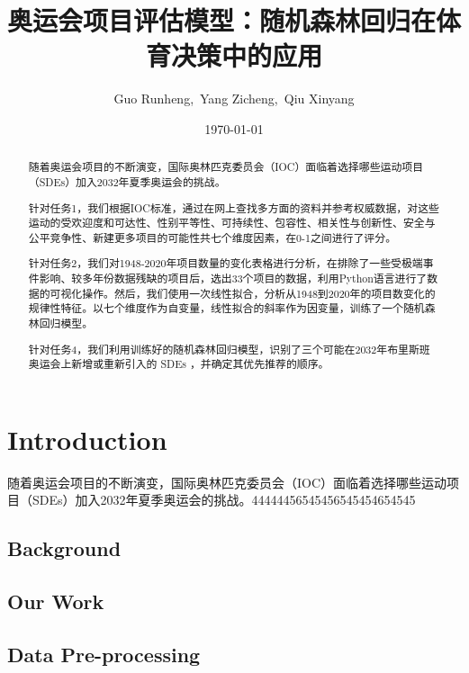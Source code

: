 \documentclass[a4paper]{article}
\title{奥运会项目评估模型：随机森林回归在体育决策中的应用}
\author{ Guo Runheng,\ Yang Zicheng,\ Qiu Xinyang}
\date{\today}
\begin{document}
    \maketitle


\begin{abstract}
    随着奥运会项目的不断演变，国际奥林匹克委员会（IOC）面临着选择哪些运动项目（SDEs）加入2032年夏季奥运会的挑战。
    \par 针对任务1，我们根据IOC标准，通过在网上查找多方面的资料并参考权威数据，对这些运动的受欢迎度和可达性、性别平等性、可持续性、包容性、相关性与创新性、安全与公平竞争性、新建更多项目的可能性共七个维度因素，在0-1之间进行了评分。
	\par 针对任务2，我们对1948-2020年项目数量的变化表格进行分析，在排除了一些受极端事件影响、较多年份数据残缺的项目后，选出33个项目的数据，利用Python语言进行了数据的可视化操作。然后，我们使用一次线性拟合，分析从1948到2020年的项目数变化的规律性特征。以七个维度作为自变量，线性拟合的斜率作为因变量，训练了一个随机森林回归模型。
    \par 针对任务4，我们利用训练好的随机森林回归模型，识别了三个可能在2032年布里斯班奥运会上新增或重新引入的 SDEs ，并确定其优先推荐的顺序。
\end{abstract}
\tableofcontents
\section{Introduction}
随着奥运会项目的不断演变，国际奥林匹克委员会（IOC）面临着选择哪些运动项目（SDEs）加入2032年夏季奥运会的挑战。44444456545456545454654545
\subsection{Background}     
\subsection{Our Work}
\subsection{Data Pre-processing}
\end{document}
